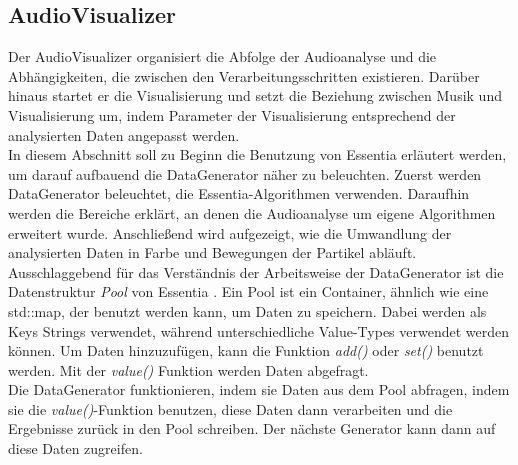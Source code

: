 \documentclass[11pt,a4paper]{article}
\begin{document}
\subsection{AudioVisualizer}
Der AudioVisualizer organisiert die Abfolge der Audioanalyse und die Abhängigkeiten, die zwischen den Verarbeitungsschritten existieren. Darüber hinaus startet er die Visualisierung und setzt die Beziehung zwischen Musik und Visualisierung um, indem Parameter der Visualisierung entsprechend der analysierten Daten angepasst werden.\\
In diesem Abschnitt soll zu Beginn die Benutzung von Essentia erläutert werden, um darauf aufbauend die DataGenerator näher zu beleuchten. Zuerst werden DataGenerator beleuchtet, die Essentia-Algorithmen verwenden. Daraufhin werden die Bereiche erklärt, an denen die Audioanalyse um eigene Algorithmen erweitert wurde. Anschließend wird aufgezeigt, wie die Umwandlung der analysierten Daten in Farbe und Bewegungen der Partikel abläuft.\\
Ausschlaggebend für das Verständnis der Arbeitsweise der DataGenerator ist die Datenstruktur \textit{Pool} von Essentia \cite{EssentiaPool}. Ein Pool ist ein Container, ähnlich wie eine std::map, der benutzt werden kann, um Daten zu speichern. Dabei werden als Keys Strings verwendet, während unterschiedliche Value-Types verwendet werden können. Um Daten hinzuzufügen, kann die Funktion \textit{add()} oder \textit{set()} benutzt werden. Mit der \textit{value()} Funktion werden Daten abgefragt.\\
Die DataGenerator funktionieren, indem sie Daten aus dem Pool abfragen, indem sie die \textit{value()}-Funktion benutzen, diese Daten dann verarbeiten und die Ergebnisse zurück in den Pool schreiben. Der nächste Generator kann dann auf diese Daten zugreifen.
\end{document}
